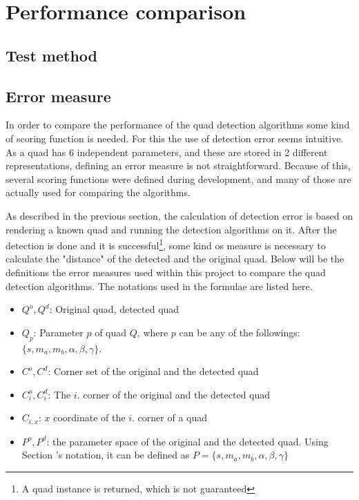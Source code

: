 \section{Performance comparison}

\subsection{Test method}

\subsection{Error measure}

In order to compare the performance of the quad detection algorithms some kind of scoring function is needed.
For this the use of detection error seems intuitive.
As a quad has 6 independent parameters, and these are stored in 2 different representations, defining an error measure is not straightforward.
Because of this, several scoring functions were defined during development, and many of those are actually used for comparing the algorithms.

As described in the previous section, the calculation of detection error is based on rendering a known quad and running the detection algorithms on it.
After the detection is done and it is successful\footnote{A quad instance is returned, which is not guaranteed}, some kind os measure is necessary to calculate the "distance" of the detected and the original quad.
Below will be the definitions the error measures used within this project to compare the quad detection algorithms.
The notations used in the formulae are listed here.
\begin{itemize}
	\item $Q^o, Q^d$: Original quad, detected quad
	\item $Q_p$: Parameter $p$ of quad $Q$, where $p$ can be any of the followings: $\{s, m_a, m_b, \alpha, \beta, \gamma\}$. 
	\item $C^o, C^d$: Corner set of the original and the detected quad
	\item $C_i^o, C_i^d$: The $i.$ corner of the original and the detected quad
	\item $C_{i,x}$: $x$ coordinate of the $i.$ corner of a quad
	\item $P^o, P^d$: the parameter space of the original and the detected quad. Using Section 's notation, it can be defined as $P = \{s, m_a, m_b, \alpha, \beta, \gamma\}$
\end{itemize}

